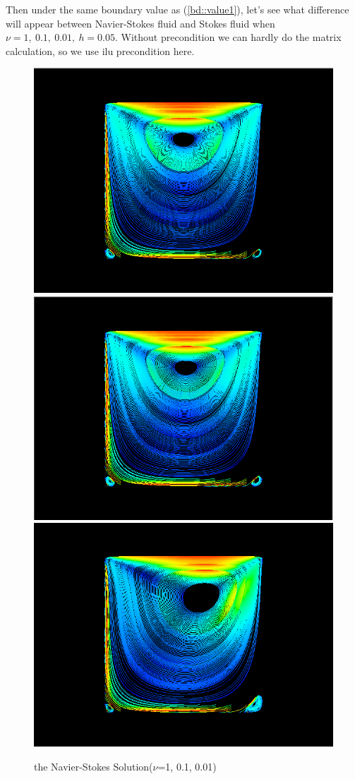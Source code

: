 \documentclass[a4paper]{article}
\begin{document}
\indent Then under the same boundary value as (\ref{bd::value1}), let's see what difference will appear between Navier-Stokes fluid and Stokes fluid when $\nu=1,\ 0.1,\ 0.01,\ h=0.05$. Without precondition we can hardly do the matrix calculation, so we use ilu precondition here.
\begin{figure}[h]
\centering
\includegraphics[scale = 0.2]{a.png}
\includegraphics[scale = 0.2]{b.png}
\includegraphics[scale = 0.2]{c.png}
\caption{the Navier-Stokes Solution($\nu$=1, 0.1, 0.01)}
\label{im::Navier-Stoke-solution}
\end{figure}
\end{document}
